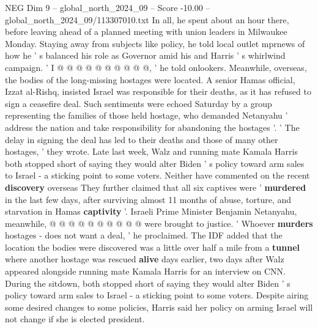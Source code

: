 \begin{textsample}{NEG Dim 9 – global\_north\_2024\_09 – Score -10.00 – global\_north\_2024\_09/113307010.txt}
In all, he spent about an hour there, before leaving ahead of a planned meeting with union leaders in Milwaukee Monday.
Staying away from subjects like policy, he told local outlet mprnews of how he ' s balanced his role as Governor amid his and Harris ' s whirlwind campaign. ' I @ @ @ @ @ @ @ @ @ @, ' he told onlookers.
Meanwhile, overseas, the bodies of the long-missing hostages were located.
A senior Hamas official, Izzat al-Rishq, insisted Israel was responsible for their deaths, as it has refused to sign a ceasefire deal.
Such sentiments were echoed Saturday by a group representing the families of those held hostage, who demanded Netanyahu ' address the nation and take responsibility for abandoning the hostages '. ' The delay in signing the deal has led to their deaths and those of many other hostages, ' they wrote.
Late last week, Walz and running mate Kamala Harris both stopped short of saying they would alter Biden ' s policy toward arm sales to Israel - a sticking point to some voters.
Neither have commented on the recent \textbf{discovery} overseas They further claimed that all six captives were ' \textbf{murdered} in the last few days, after surviving almost 11 months of abuse, torture, and starvation in Hamas \textbf{captivity} '.
Israeli Prime Minister Benjamin Netanyahu, meanwhile, @ @ @ @ @ @ @ @ @ @ were brought to justice. ' Whoever \textbf{murders} hostages - does not want a deal, ' he proclaimed.
The IDF added that the location the bodies were discovered was a little over half a mile from a \textbf{tunnel} where another hostage was rescued \textbf{alive} days earlier, two days after Walz appeared alongside running mate Kamala Harris for an interview on CNN.
During the sitdown, both stopped short of saying they would alter Biden ' s policy toward arm sales to Israel - a sticking point to some voters.
Despite airing some desired changes to some policies, Harris said her policy on arming Israel will not change if she is elected president.

\end{textsample}
